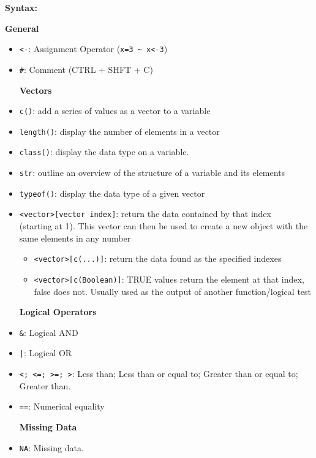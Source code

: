 \documentclass{article}
\begin{document}
\textbf{Syntax:}
\begin{center}
    \textbf{General}
\end{center}
\begin{itemize}
    \item \verb|<-|: Assignment Operator (\verb|x=3 ~ x<-3|)
    \item \verb|#|: Comment (CTRL + SHFT + C)
    \begin{center}
        \textbf{Vectors}
    \end{center}
    \item \verb|c()|: add a series of values as a vector to a variable
    \item \verb|length()|: display the number of elements in a vector
    \item \verb|class()|: display the data type on a variable.
    \item \verb|str|: outline an overview of the structure of a variable and its elements
    \item \verb|typeof()|: display the data type of a given vector
    \item \verb|<vector>[vector index]|: return the data contained by that index \\(starting at 1). This vector can then be used to create a new object with the same elements in any number
    \begin{itemize}
        \item \verb|<vector>[c(...)]|: return the data found as the specified indexes
        \item \verb|<vector>[c(Boolean)]|: TRUE values return the element at that index, false does not. Usually used as the output of another function/logical test
    \end{itemize}
    \begin{center}
        \textbf{Logical Operators}
    \end{center}
    \item \verb|&|: Logical AND
    \item \texttt{|}: Logical OR
    \item \verb|<; <=; >=; >|: Less than; Less than or equal to; Greater than or equal to; Greater than.
    \item \verb|==|: Numerical equality
    \begin{center}
       \textbf{Missing Data} 
    \end{center}
    \item \verb|NA|: Missing data.
    \begin{itemize}

\end{itemize}
\end{itemize}
\end{document}
